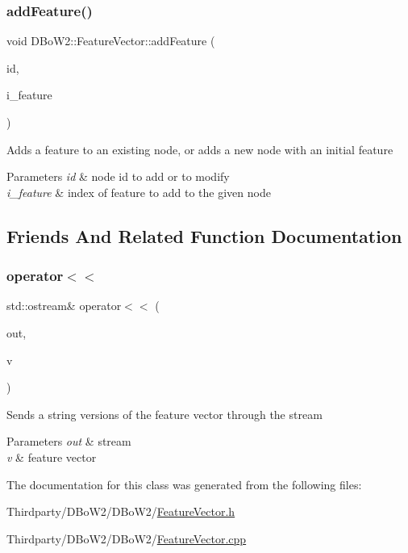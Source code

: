 \subsubsection{\texorpdfstring{add\+Feature()}{addFeature()}}
{\footnotesize\ttfamily void D\+Bo\+W2\+::\+Feature\+Vector\+::add\+Feature (\begin{DoxyParamCaption}\item[{\mbox{\hyperlink{namespace_d_bo_w2_a3a0fa9c50c0df508759362d6204566f2}{Node\+Id}}}]{id,  }\item[{unsigned int}]{i\+\_\+feature }\end{DoxyParamCaption})}

Adds a feature to an existing node, or adds a new node with an initial feature 
\begin{DoxyParams}{Parameters}
{\em id} & node id to add or to modify \\
\hline
{\em i\+\_\+feature} & index of feature to add to the given node \\
\hline
\end{DoxyParams}


\subsection{Friends And Related Function Documentation}
\mbox{\label{class_d_bo_w2_1_1_feature_vector_a34aa65c93dc5f6be269610e3f238d9b1}} 
\subsubsection{\texorpdfstring{operator$<$$<$}{operator<<}}
{\footnotesize\ttfamily std\+::ostream\& operator$<$$<$ (\begin{DoxyParamCaption}\item[{std\+::ostream \&}]{out,  }\item[{const \mbox{\hyperlink{class_d_bo_w2_1_1_feature_vector}{Feature\+Vector}} \&}]{v }\end{DoxyParamCaption})\hspace{0.3cm}{\ttfamily [friend]}}

Sends a string versions of the feature vector through the stream 
\begin{DoxyParams}{Parameters}
{\em out} & stream \\
\hline
{\em v} & feature vector \\
\hline
\end{DoxyParams}


The documentation for this class was generated from the following files\+:\begin{DoxyCompactItemize}
\item 
Thirdparty/\+D\+Bo\+W2/\+D\+Bo\+W2/\mbox{\hyperlink{_feature_vector_8h}{Feature\+Vector.\+h}}\item 
Thirdparty/\+D\+Bo\+W2/\+D\+Bo\+W2/\mbox{\hyperlink{_feature_vector_8cpp}{Feature\+Vector.\+cpp}}\end{DoxyCompactItemize}
